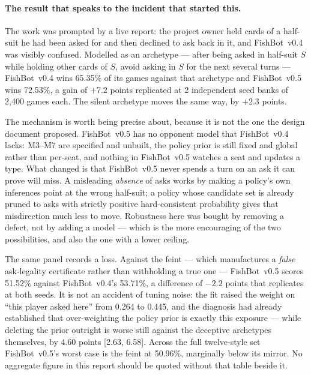 \documentclass[11pt]{article}
\theoremstyle{definition}
\DeclareRobustCommand{\vfive}{\texorpdfstring{\mbox{FishBot v0.5}}{FishBot v0.5}}
\DeclareRobustCommand{\vfour}{\texorpdfstring{\mbox{FishBot v0.4}}{FishBot v0.4}}
\providecommand{\numDecSeeds}{2}
\providecommand{\numDecGames}{2{,}400}
\providecommand{\numDecSilentDelta}{+2.3}
\providecommand{\numDecFeintFive}{51.52}
\providecommand{\numDecFeintFour}{53.71}
\providecommand{\numDecFeintDelta}{-2.2}
\providecommand{\numDecWithholderFive}{72.53}
\providecommand{\numDecWithholderFour}{65.35}
\providecommand{\numDecWithholderDelta}{+7.2}
\providecommand{\numDecWorst}{50.96}
\providecommand{\numDecWorstOpp}{feint}
\providecommand{\numPriorThetaFour}{0.264}
\providecommand{\numPriorThetaFive}{0.445}
\providecommand{\numPriorDeleteCI}{2.63, 6.58}
\providecommand{\numPriorDeleteCost}{4.60}
\begin{document}
\paragraph{The result that speaks to the incident that started this.} The work
was prompted by a live report: the project owner held cards of a half-suit he
had been asked for and then declined to ask back in it, and \vfour{} was visibly
confused. Modelled as an archetype --- after being asked in half-suit $S$ while
holding other cards of $S$, avoid asking in $S$ for the next several turns ---
\vfour{} wins \numDecWithholderFour\% of its games against that archetype and
\vfive{} wins \numDecWithholderFive\%, a gain of $\numDecWithholderDelta$ points
replicated at \numDecSeeds{} independent seed banks of \numDecGames{} games
each. The silent archetype moves the same way, by $\numDecSilentDelta$ points.

The mechanism is worth being precise about, because it is not the one the design
document proposed. \vfive{} has no opponent model that \vfour{} lacks: M3--M7
are specified and unbuilt, the policy prior is still fixed and global rather than
per-seat, and nothing in \vfive{} watches a seat and updates a type. What changed is that
\vfive{} never spends a turn on an ask it can prove will miss. A misleading
\emph{absence} of asks works by making a policy's own inferences point at the
wrong half-suit; a policy whose candidate set is already pruned to asks with
strictly positive hard-consistent probability gives that misdirection much less
to move. Robustness here was bought by removing a defect, not by adding a
model --- which is the more encouraging of the two possibilities, and also the
one with a lower ceiling.

The same panel records a loss. Against the feint --- which manufactures a
\emph{false} ask-legality certificate rather than withholding a true one ---
\vfive{} scores \numDecFeintFive\% against \vfour{}'s \numDecFeintFour\%, a
difference of $\numDecFeintDelta$ points that replicates at both seeds. It is
not an accident of tuning noise: the fit raised the weight on ``this player asked here''
from \numPriorThetaFour{} to \numPriorThetaFive{}, and the diagnosis had already
established that over-weighting the policy prior is exactly this exposure ---
while deleting the prior outright is worse still against the deceptive
archetypes themselves, by \numPriorDeleteCost{} points
[\numPriorDeleteCI]. Across the full twelve-style set \vfive{}'s worst case is the
\numDecWorstOpp{} at \numDecWorst\%, marginally below its mirror. No aggregate
figure in this report should be quoted without that table beside it.
\end{document}

